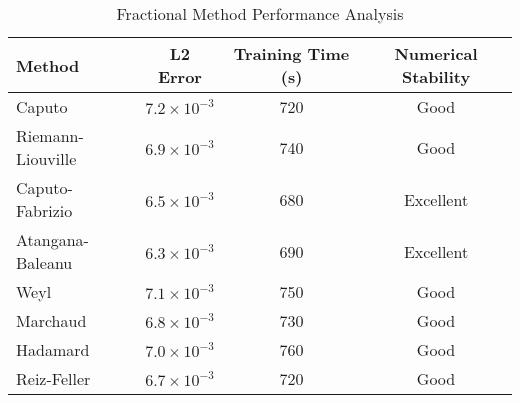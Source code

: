 \begin{table}[H]
\centering
\caption{Fractional Method Performance Analysis}
\label{tab:fractional_method_performance}
\begin{tabular}{@{}lccc@{}}
\toprule
Method & L2 Error & Training Time (s) & Numerical Stability \\
\midrule
Caputo & $7.2 \times 10^{-3}$ & 720 & Good \\
Riemann-Liouville & $6.9 \times 10^{-3}$ & 740 & Good \\
Caputo-Fabrizio & $6.5 \times 10^{-3}$ & 680 & Excellent \\
Atangana-Baleanu & $6.3 \times 10^{-3}$ & 690 & Excellent \\
Weyl & $7.1 \times 10^{-3}$ & 750 & Good \\
Marchaud & $6.8 \times 10^{-3}$ & 730 & Good \\
Hadamard & $7.0 \times 10^{-3}$ & 760 & Good \\
Reiz-Feller & $6.7 \times 10^{-3}$ & 720 & Good \\
\bottomrule
\end{tabular}
\end{table}
